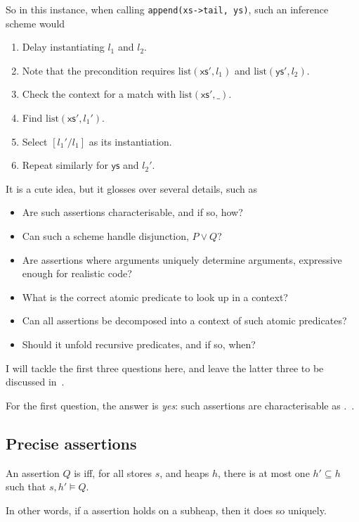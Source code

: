 So in this instance, when calling \texttt{append(xs->tail, ys)}, %
such an inference scheme would
\begin{enumerate}
    \item Delay instantiating $l_1$ and $l_2$.
    \item Note that the precondition requires $\mathrm{list}(\mathsf{xs}',
        l_1)$ and $\mathrm{list}(\mathsf{ys}', l_2)$.
    \item Check the context for a match with $\mathrm{list}(\mathsf{xs}',
        \_)$.
    \item Find $\mathrm{list}(\mathsf{xs}', l_1')$.
    \item Select $[l_1' / l_1]$ as its instantiation.
    \item Repeat similarly for $\mathsf{ys}$ and $l_2'$.
\end{enumerate}

It is a cute idea, but it glosses over several details, such as
\begin{itemize}
    \item Are such assertions characterisable, and if so, how?
    \item Can such a scheme handle disjunction, $ P \vee{} Q$?
    \item Are assertions where  arguments uniquely determine
         arguments, expressive enough for realistic code?
    \item What is the correct atomic predicate to look up in a context?
    \item Can all assertions be decomposed into a context of such atomic
        predicates?
    \item Should it unfold recursive predicates, and if so, when?
\end{itemize}

I will tackle the first three questions here, and leave the latter three
to be discussed in~.

For the first question, the answer is \emph{yes}: such assertions are
characterisable as .~.

\subsection{Precise assertions}

\begin{definition}\label{def:precise}
    \AP{} An assertion $Q$ is  iff, for all stores $s$, and heaps
    $h$, there is at most one $h' \subseteq{} h$ such that $s , h' \vDash{} Q$.

    In other words, if a  assertion holds on a subheap, then it
    does so uniquely.
\end{definition}

